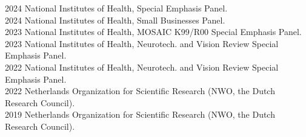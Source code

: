 2024 \hspace{58pt} National Institutes of Health, Special Emphasis Panel. \\ 
2024 \hspace{58pt} National Institutes of Health, Small Businesses Panel. \\
2023 \hspace{58pt} National Institutes of Health, MOSAIC K99/R00 Special Emphasis Panel. \\
2023 \hspace{58pt} National Institutes of Health, Neurotech. and Vision Review Special Emphasis Panel. \\
2022 \hspace{58pt} National Institutes of Health, Neurotech. and Vision Review Special Emphasis Panel. \\
2022 \hspace{58pt} Netherlands Organization for Scientific Research (NWO, the Dutch Research Council). \\
2019 \hspace{58pt} Netherlands Organization for Scientific Research (NWO, the Dutch Research Council). \\
\\